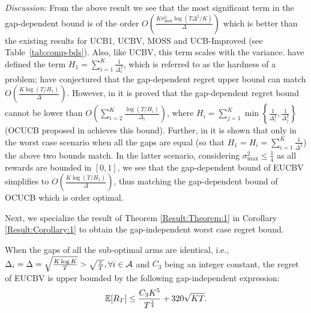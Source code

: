 \emph{Discussion:} From the above result we see that the most significant term in the gap-dependent bound is of the order $O\left(\frac{K\sigma^2_{\max}\log{(T\Delta^{2}/K)}}{\Delta}\right)$ which is better than the existing results for UCB1, UCBV, MOSS and UCB-Improved (see Table~\ref{tab:comp-bds}). Also, like UCBV, this term scales with the variance. \citet{audibert2010best} have defined the term $H_1=\sum_{i=1}^{K}\frac{1}{\Delta_i^2}$, which is referred to as the hardness of a problem; \citet{bubeck2012regret} have conjectured that the gap-dependent regret upper bound can match $O\left(\frac{K\log{(T/H_1)}}{\Delta}\right)$. However, in  \citet{lattimore2015optimally} it is proved that the gap-dependent regret bound cannot be lower than $O\left(\sum_{i=2}^{K}\frac{\log\left(T/H_i\right)}{\Delta_i}\right)$, where $H_i=\sum_{j=1}^{K}\min\left\lbrace \frac{1}{\Delta_i^2},\frac{1}{\Delta_j^2}\right\rbrace$ (OCUCB proposed in \citet{lattimore2015optimally} achieves this bound). Further, in \citet{lattimore2015optimally} it is shown that only in the worst case scenario when all the gaps are equal (so that $H_1=H_{i}=\sum_{i=1}^{K}\frac{1}{\Delta^2}$) the above two bounds match. In the latter scenario, considering $\sigma^2_{\max}\leq \frac{1}{4}$ as all rewards are bounded in $[0,1]$, we see that the gap-dependent bound of EUCBV simplifies to $O\left(\frac{K\log{(T/H_1)}}{\Delta}\right)$, thus matching the gap-dependent bound of OCUCB which is order optimal.

Next, we specialize the result of Theorem \ref{Result:Theorem:1} in Corollary \ref{Result:Corollary:1} to  obtain the gap-independent worst case regret bound. %



\begin{corollary}
\label{Result:Corollary:1}
When the gaps of all the sub-optimal arms are identical, i.e., $\Delta_i =\Delta = \sqrt{\frac{K\log K}{T}}>\sqrt{\frac{e}{T}}, \forall i\in \mathcal{A}$ and $C_3$ being an integer constant, the
regret of EUCBV is upper bounded by the following gap-independent expression:
\begin{align*}
	\mathbb{E}[R_{T}]\leq  \dfrac{C_3 K^5}{T^{\frac{1}{4}}} + 320\sqrt{KT}.
\end{align*}	
\end{corollary}
	
